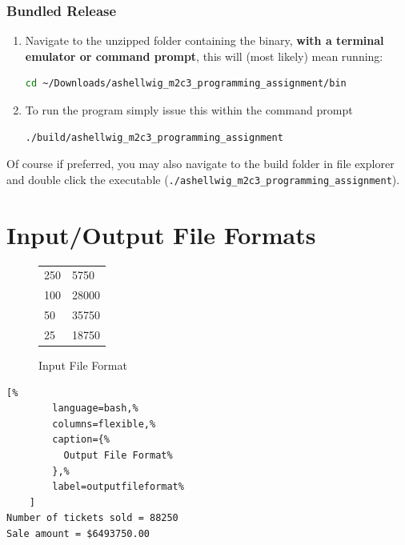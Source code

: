 \documentclass[a4paper, 11pt]{article}
\begin{document}
      \subsubsection{Bundled Release}
        \begin{enumerate}
          \item Navigate to the unzipped folder containing the binary,
            \textbf{with a terminal emulator or command prompt}, this will
            (most likely) mean running:
            \begin{lstlisting}[language=bash]
cd ~/Downloads/ashellwig_m2c3_programming_assignment/bin
            \end{lstlisting}
          \item To run the program simply issue this within the command
            prompt
            \begin{lstlisting}[language=bash]
./build/ashellwig_m2c3_programming_assignment
            \end{lstlisting}
        \end{enumerate}
        Of course if preferred, you may also navigate to the build folder in
          file explorer and double click the executable
          (\texttt{./ashellwig\_m2c3\_programming\_assignment}).


  \section{Input/Output File Formats}\label{sec:filetypes}
    \noindent\begin{minipage}{.45\textwidth}
      \begin{figure}[H]
        \begin{tabular}{ |ll| }
          \hline
          250 &5750 \\
          100 &28000 \\
          50  &35750 \\
          25  &18750 \\
          \hline
        \end{tabular}
        \centering
        \caption{Input File Format}
      \end{figure}
    \end{minipage}\hfill
    \begin{minipage}[t]{.45\textwidth}
      \begin{lstlisting}[%
        language=bash,%
        columns=flexible,%
        caption={%
          Output File Format%
        },%
        label=outputfileformat%
    ]
Number of tickets sold = 88250
Sale amount = $6493750.00
      \end{lstlisting}
    \end{minipage}
\end{document}
